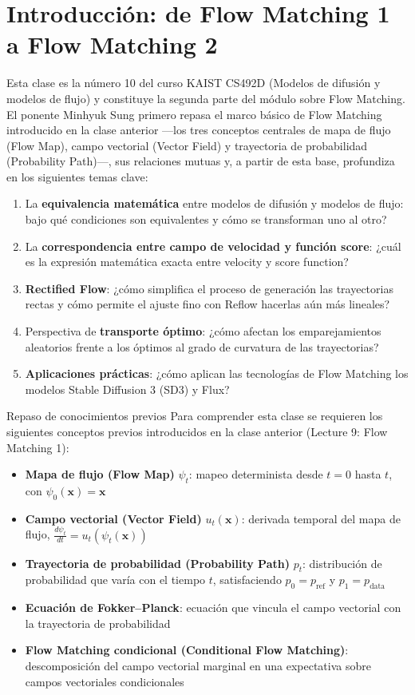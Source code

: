 \section{Introducción: de Flow Matching 1 a Flow Matching 2}

Esta clase es la número 10 del curso KAIST CS492D (Modelos de difusión y modelos de flujo) y constituye la segunda parte del módulo sobre Flow Matching. El ponente Minhyuk Sung primero repasa el marco básico de Flow Matching introducido en la clase anterior —los tres conceptos centrales de mapa de flujo (Flow Map), campo vectorial (Vector Field) y trayectoria de probabilidad (Probability Path)—, sus relaciones mutuas y, a partir de esta base, profundiza en los siguientes temas clave:

\begin{enumerate}
    \item La \textbf{equivalencia matemática} entre modelos de difusión y modelos de flujo: bajo qué condiciones son equivalentes y cómo se transforman uno al otro?
    \item La \textbf{correspondencia entre campo de velocidad y función score}: ¿cuál es la expresión matemática exacta entre velocity y score function?
    \item \textbf{Rectified Flow}: ¿cómo simplifica el proceso de generación las trayectorias rectas y cómo permite el ajuste fino con Reflow hacerlas aún más lineales?
    \item Perspectiva de \textbf{transporte óptimo}: ¿cómo afectan los emparejamientos aleatorios frente a los óptimos al grado de curvatura de las trayectorias?
    \item \textbf{Aplicaciones prácticas}: ¿cómo aplican las tecnologías de Flow Matching los modelos Stable Diffusion 3 (SD3) y Flux?
\end{enumerate}

\begin{knowledgebox}{Repaso de conocimientos previos}
Para comprender esta clase se requieren los siguientes conceptos previos introducidos en la clase anterior (Lecture 9: Flow Matching 1):
\begin{itemize}
    \item \textbf{Mapa de flujo (Flow Map)} $\psi_t$: mapeo determinista desde $t=0$ hasta $t$, con $\psi_0(\mathbf{x}) = \mathbf{x}$
    \item \textbf{Campo vectorial (Vector Field)} $u_t(\mathbf{x})$: derivada temporal del mapa de flujo, $\frac{d\psi_t}{dt} = u_t(\psi_t(\mathbf{x}))$
    \item \textbf{Trayectoria de probabilidad (Probability Path)} $p_t$: distribución de probabilidad que varía con el tiempo $t$, satisfaciendo $p_0 = p_{\text{ref}}$ y $p_1 = p_{\text{data}}$
    \item \textbf{Ecuación de Fokker--Planck}: ecuación que vincula el campo vectorial con la trayectoria de probabilidad
    \item \textbf{Flow Matching condicional (Conditional Flow Matching)}: descomposición del campo vectorial marginal en una expectativa sobre campos vectoriales condicionales
\end{itemize}
\end{knowledgebox}

